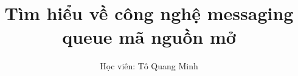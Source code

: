 \documentclass[a4paper, 14pt]{article} %
\begin{document}
\title{Tìm hiểu về công nghệ messaging queue mã nguồn mở}
\author{Học viên: Tô Quang Minh}
\maketitle
\flushleft





\end{document}
